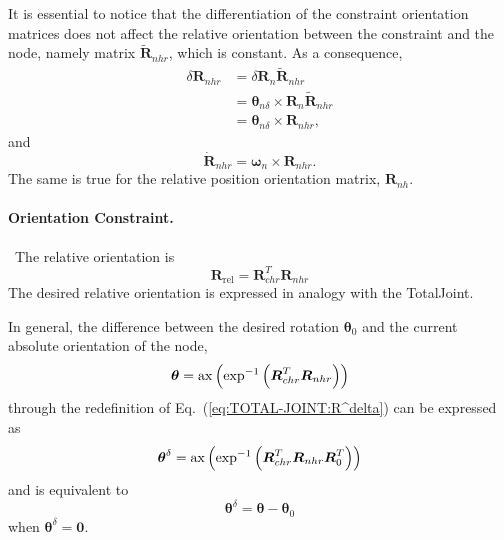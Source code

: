\documentclass[10pt,dvips,fleqn,subeqn]{report}
\newcommand{\T}[1]{\boldsymbol{#1}}
\begin{document}
It is essential to notice that the differentiation of the constraint
orientation matrices does not affect the relative orientation between
the constraint and the node, namely matrix $\tilde{\T{R}}_{nhr}$,
which is constant.
As a consequence,
\begin{align}
	\delta\T{R}_{nhr}
		&= \delta\T{R}_n \tilde{\T{R}}_{nhr} \nonumber \\
		&= \T{\theta}_{n\delta} \times \T{R}_n \tilde{\T{R}}_{nhr}
		\nonumber \\
		&= \T{\theta}_{n\delta}\times \T{R}_{nhr} ,
\end{align}
and
\begin{equation}
	\dot{\T{R}}_{nhr} = \T{\omega}_n \times \T{R}_{nhr} .
\end{equation}
The same is true for the relative position orientation matrix,
$\T{R}_{nh}$.


\paragraph{Orientation Constraint.} \
The relative orientation is
\begin{equation}
	\T{R}_{\mathrm{rel}} = \T{R}_{chr}^T \T{R}_{nhr}
\end{equation}
The desired relative orientation is expressed in analogy 
with the TotalJoint.

In general, the difference between the desired rotation
$\T{\theta}_0$ and the current absolute orientation of the node,
\begin{equation}
	\T{\theta} = \llk{ax}\plbr{\exp^{-1}\plbr{
		\T{R}_{chr}^T \T{R}_{nhr}
	}}
\end{equation}
through the redefinition of Eq.~(\ref{eq:TOTAL-JOINT:R^delta}) 
can be expressed as
\begin{equation}
	\T{\theta}^{\delta} = \llk{ax}\plbr{\exp^{-1}\plbr{
		\T{R}_{chr}^T \T{R}_{nhr} \T{R}_0^T
	}}
	\label{eq:TOTAL-PIN-JOINT:thetadelta}
\end{equation}
and is equivalent to
\begin{equation}
	\T{\theta}^{\delta} = \T{\theta} - \T{\theta}_0
\end{equation}
when $\T{\theta}^{\delta}=\T{0}$.
\end{document}

